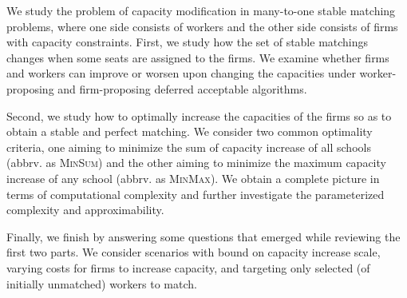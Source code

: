 We study the problem of capacity modification in many-to-one stable matching problems, where one side consists of workers and the other side consists of firms with capacity constraints. First, we study how the set of stable matchings changes when some seats are assigned to the firms. We examine whether firms and workers can improve or worsen upon changing the capacities under worker-proposing and firm-proposing deferred acceptable algorithms.

Second, we study how to optimally increase the capacities of the firms so as to obtain a stable and perfect matching. We consider two common optimality criteria, one aiming to minimize the sum of capacity increase of all schools (abbrv. as \textsc{MinSum}) and the other aiming to minimize the maximum capacity increase of any school (abbrv. as \textsc{MinMax}). We obtain a complete picture in terms of computational complexity and further investigate the parameterized complexity and approximability.

Finally, we finish by answering some questions that emerged while reviewing the first two parts. We consider scenarios with bound on capacity increase scale, varying costs for firms to increase capacity, and targeting only selected (of initially unmatched) workers to match.
